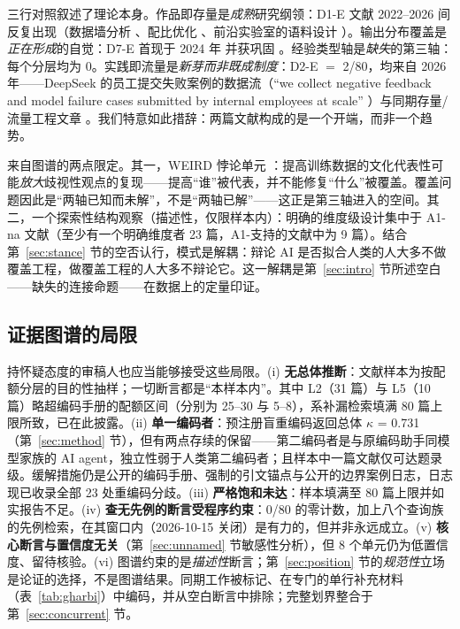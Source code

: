 \documentclass[10pt,fontset=fandol]{ctexart}
\begin{document}
三行对照叙述了理论本身。作品即存量是\emph{成熟}研究纲领：D1-E 文献 2022--2026 间反复出现（数据墙分析 \cite{villalobos2022data}、配比优化 \cite{xie2023doremi, ye2024data}、前沿实验室的语料设计 \cite{grattafiori2024llama3, penedo2024fineweb}）。输出分布覆盖是\emph{正在形成}的自觉：D7-E 首现于 2024 年 \cite{shumailov2024collapse} 并获巩固 \cite{jiang2025hivemind, sorensen2025spectrum}。经验类型轴是\emph{缺失}的第三轴：每个分层均为 0。实践即流量是\emph{新芽而非既成制度}：D2-E $=$ 2/80，均来自 2026 年——DeepSeek 的员工提交失败案例的数据流（“we collect negative feedback and model failure cases submitted by internal employees at scale” \cite{deepseek2026v41}）与同期存量/流量工程文章 \cite{gharbi2026model}。我们特意如此措辞：两篇文献构成的是一个开端，而非一个趋势。

来自图谱的两点限定。其一，WEIRD 悖论单元 \cite{zhou2025should}：提高训练数据的文化代表性可能\emph{放大}歧视性观点的复现——提高“谁”被代表，并不能修复“什么”被覆盖。覆盖问题因此是“两轴已知而未解”，不是“两轴已解”——这正是第三轴进入的空间。其二，一个探索性结构观察（描述性，仅限样本内）：明确的维度级设计集中于 A1-na 文献（至少有一个明确维度者 23 篇，A1-支持的文献中为 9 篇）。结合第~\ref{sec:stance} 节的空否认行，模式是解耦：辩论 AI 是否拟合人类的人大多不做覆盖工程，做覆盖工程的人大多不辩论它。这一解耦是第~\ref{sec:intro} 节所述空白——缺失的连接命题——在数据上的定量印证。

\subsection{证据图谱的局限}\label{sec:maplimits}

持怀疑态度的审稿人也应当能够接受这些局限。(i) \textbf{无总体推断}：文献样本为按配额分层的目的性抽样；一切断言都是“本样本内”。其中 L2（31 篇）与 L5（10 篇）略超编码手册的配额区间（分别为 25--30 与 5--8），系补漏检索填满 80 篇上限所致，已在此披露。(ii) \textbf{单一编码者}：预注册盲重编码返回总体 $\kappa$ = 0.731（第~\ref{sec:method} 节），但有两点存续的保留——第二编码者是与原编码助手同模型家族的 AI agent，独立性弱于人类第二编码者；且样本中一篇文献仅可达题录级。缓解措施仍是公开的编码手册、强制的引文锚点与公开的边界案例日志，日志现已收录全部 23 处重编码分歧。(iii) \textbf{严格饱和未达}：样本填满至 80 篇上限并如实报告不足。(iv) \textbf{查无先例的断言受程序约束}：0/80 的零计数，加上八个查询族的先例检索，在其窗口内（2026-10-15 关闭）是有力的，但并非永远成立。(v) \textbf{核心断言与置信度无关}（第~\ref{sec:unnamed} 节敏感性分析），但 8 个单元仍为低置信度、留待核验。(vi) 图谱约束的是\emph{描述性}断言；第~\ref{sec:position} 节的\emph{规范性}立场是论证的选择，不是图谱结果。同期工作被标记、在专门的单行补充材料（表~\ref{tab:gharbi}）中编码，并从空白断言中排除；完整划界整合于第~\ref{sec:concurrent} 节。
\end{document}
